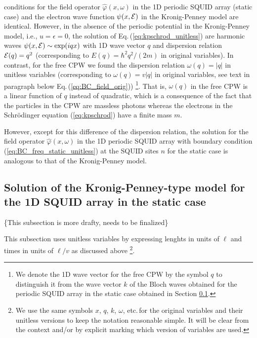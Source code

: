 conditions for the field operator $\hat{\varphi}(x, \omega)$ in the 1D periodic SQUID array
(static case)
and the electron wave function $\psi(x,{\cal E})$ in the Kronig-Penney model 
are identical. However,
in the absence of the periodic potential in the Kronig-Penney model, i.e., $u=\epsilon=0$, 
the solution of Eq.\,(\ref{eq:kpschrod_unitless}) 
are harmonic waves $\psi(x,{\cal E}) \sim \exp(i q x)$ with 1D wave vector $q$ and dispersion relation 
${\cal E}(q) = q^2$ (corresponding to 
$\displaystyle E(q) = \hbar^2 q^2 / (2 m)$ in original variables).
In contrast, for the free CPW we found the dispersion relation
$\omega(q) = |q|$ in unitless variables (corresponding to $\omega(q) = v |q|$ in original variables,
see text in paragraph below Eq.\,(\ref{eq:BC_field_orig}))
%
\footnote{We denote the 1D wave vector for the free CPW by the symbol $q$ to distinguish it 
from the wave vector $k$ of the Bloch waves obtained for the periodic SQUID array in the static case
obtained in Section \ref{subsec:kpsol}.}.
%
That is, $\omega(q)$ in the free CPW is a linear 
function of $q$ instead of quadratic, which is a consequence of the fact that the particles 
in the CPW are massless photons whereas the electrons in the Schr\"odinger equation (\ref{eq:kpschrod})
have a finite mass $m$. 

However, except for this difference of the dispersion relation, the solution for the 
field operator $\hat{\varphi}(x, \omega)$ in the 1D periodic SQUID array 
with boundary condition (\ref{eq:BC_freq_static_unitless}) at the SQUID sites $n$ for the static case
is analogous to that of the Kronig-Penney model. 


\subsection{Solution of the Kronig-Penney-type model for the 1D SQUID array in the static case}
\label{subsec:kpsol}

\color{red}
\{This subsection is more drafty, needs to be finalized\}
\color{black}

\noindent
This subsection uses unitless variables
by expressing lenghts in units of $\ell$ and times in units of $\ell/v$ as discussed above
\footnote{We use the same symbols $x$, $q$, $k$, $\omega$, etc.\,for the original variables 
and their unitless versions to keep the notation reasonable simple. It will be clear from 
the context and/or by explicit marking which version of variables are used.}.

